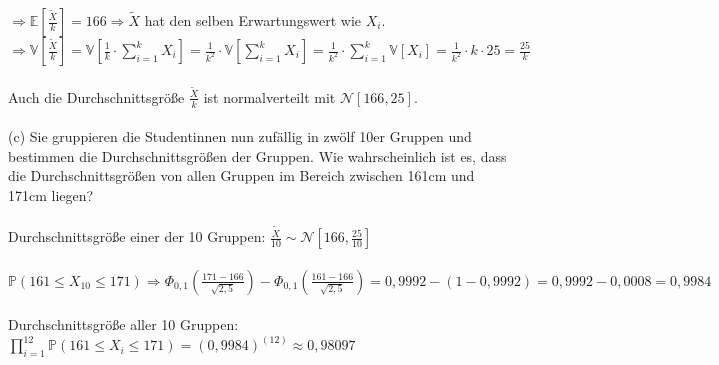 \documentclass[a4paper]{article}
\begin{document}
\(\Rightarrow \mathbb{E}\left[\frac{\widetilde{X}}{k}\right]=166 \Rightarrow \widetilde{X}\) hat den selben Erwartungswert wie $X_i$.\\
\(\Rightarrow \mathbb{V}\left[\frac{\widetilde{X}}{k}\right]=\mathbb{V}\left[\frac{1}{k}\cdot \sum\limits^k_{i=1} X_i\right]=\frac{1}{k^2} \cdot \mathbb{V}\left[\sum\limits^k_{i=1}X_i\right]=\frac{1}{k^2}\cdot \sum\limits^k_{i=1} \mathbb{V}\left[X_i\right]=\frac{1}{k^2}\cdot k \cdot 25 = \frac{25}{k}\)\\\\
Auch die Durchschnittsgröße \(\frac{\widetilde{X}}{k}\) ist normalverteilt mit \(\mathcal{N}\left[166, 25\right]\).\\\\
(c) Sie gruppieren die Studentinnen nun zufällig in zwölf 10er Gruppen und bestimmen die Durchschnittsgrößen der Gruppen. Wie wahrscheinlich ist es, dass die Durchschnittsgrößen von allen Gruppen im Bereich zwischen 161cm und 171cm liegen?\\\\
Durchschnittsgröße einer der 10 Gruppen: \(\frac{\widetilde{X}}{10} \sim \mathcal{N}\left[166, \frac{25}{10}\right]\)\\\\
\(\mathbb{P}\left(161 \leq X_{10} \leq 171\right) \Rightarrow \Phi_{0,1}\left(\frac{171-166}{\sqrt{2,5}}\right)-\Phi_{0,1}\left(\frac{161-166}{\sqrt{2,5}}\right)=0,9992-(1-0,9992)=0,9992-0,0008=0,9984\)\\\\
Durchschnittsgröße aller 10 Gruppen: \(\prod\limits^{12}_{i=1}\mathbb{P}(161 \leq X_i \leq 171)=(0,9984)^(12)\approx 0,98097\)
\end{document}
